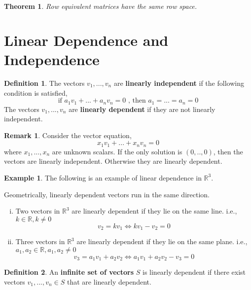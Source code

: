 \documentclass{report}
\newtheorem{_thm}{Theorem}
\theoremstyle{definition}
\newtheorem{_def}{Definition}
\newtheorem{_rem}{Remark}
\newtheorem{ex}{Example}
\begin{document}
\begin{_thm}
Row equivalent matrices have the same row space.
\end{_thm}

\section{Linear Dependence and Independence}

\begin{_def}
The vectors $v_1,...,v_n$ are \textbf{linearly independent} if the following condition is satisfied,
\[\text{if }a_1v_1+...+a_nv_n=0\text{ , then }a_1=...=a_n=0\]
The vectors $v_1,...,v_n$ are \textbf{linearly dependent} if they are not linearly independent.
\end{_def}

\begin{_rem}
Consider the vector equation,
\[x_1v_1+...+x_nv_n=0\]
where $x_1,...,x_n$ are unknown scalars.
If the only solution is $(0,..,0)$, then the vectors are linearly independent.
Otherwise they are linearly dependent.
\end{_rem}

\begin{ex}
The following is an example of linear dependence in $\mathbb{R}^3$.

Geometrically, linearly dependent vectors run in the same direction.
\begin{enumerate}[i)]
 \item Two vectors in $\mathbb{R}^3$ are linearly dependent if they lie on the same line.
 i.e., $k\in \mathbb{R}, k\neq 0$
 \[v_2=kv_1 \Leftrightarrow kv_1-v_2=0\]
 \item Three vectors in $\mathbb{R}^3$ are linearly dependent if they lie on the same plane.
 i.e., $a_1,a_2\in \mathbb{R}, a_1,a_2\neq 0$
 \[v_3=a_1v_1+a_2v_2 \Leftrightarrow a_1v_1+a_2v_2-v_3=0\]
\end{enumerate}
\end{ex}

\begin{_def}
An \textbf{infinite set of vectors} $S$ is linearly dependent if there exist vectors $v_1,...,v_n\in S$ that are linearly dependent.
\end{_def}
\end{document}

